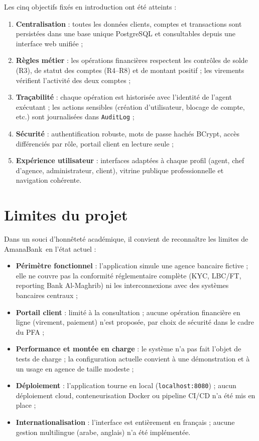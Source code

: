\documentclass[11pt,a4paper,oneside]{report}
\newcommand{\nomapplication}{AmanaBank}
\begin{document}
Les cinq objectifs fixés en introduction ont été atteints :
\begin{enumerate}
    \item \textbf{Centralisation} : toutes les données clients, comptes et transactions sont persistées dans une base unique PostgreSQL et consultables depuis une interface web unifiée ;
    \item \textbf{Règles métier} : les opérations financières respectent les contrôles de solde (R3), de statut des comptes (R4--R8) et de montant positif ; les virements vérifient l'activité des deux comptes ;
    \item \textbf{Traçabilité} : chaque opération est historisée avec l'identité de l'agent exécutant ; les actions sensibles (création d'utilisateur, blocage de compte, etc.) sont journalisées dans \texttt{AuditLog} ;
    \item \textbf{Sécurité} : authentification robuste, mots de passe hachés BCrypt, accès différenciés par rôle, portail client en lecture seule ;
    \item \textbf{Expérience utilisateur} : interfaces adaptées à chaque profil (agent, chef d'agence, administrateur, client), vitrine publique professionnelle et navigation cohérente.
\end{enumerate}

\section*{Limites du projet}

Dans un souci d'honnêteté académique, il convient de reconnaître les limites de \nomapplication\ en l'état actuel :

\begin{itemize}
    \item \textbf{Périmètre fonctionnel} : l'application simule une agence bancaire fictive ; elle ne couvre pas la conformité réglementaire complète (KYC, LBC/FT, reporting Bank Al-Maghrib) ni les interconnexions avec des systèmes bancaires centraux ;
    \item \textbf{Portail client} : limité à la consultation ; aucune opération financière en ligne (virement, paiement) n'est proposée, par choix de sécurité dans le cadre du PFA ;
    \item \textbf{Performance et montée en charge} : le système n'a pas fait l'objet de tests de charge ; la configuration actuelle convient à une démonstration et à un usage en agence de taille modeste ;
    \item \textbf{Déploiement} : l'application tourne en local (\texttt{localhost:8080}) ; aucun déploiement cloud, conteneurisation Docker ou pipeline CI/CD n'a été mis en place ;
    \item \textbf{Internationalisation} : l'interface est entièrement en français ; aucune gestion multilingue (arabe, anglais) n'a été implémentée.
\end{itemize}
\end{document}
